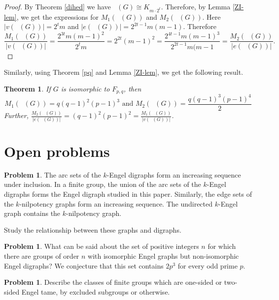\documentclass[reqno,12pt]{amsart}
\theoremstyle{plain}
\newtheorem{thm}{Theorem}[section]
\theoremstyle{definition}
\newtheorem{prob}[conj]{Problem}
\newcommand{\coeng}{\mathop{\mathcal{E}_c^-}}
\begin{document}
{\begin{proof}
By Theorem \ref{dihed}	we have $\coeng(G) \cong K_{m\cdot 2^t}$. Therefore, by Lemma \ref{ZI-lem}, we get the expressions for  $M_1(\coeng(G))$ and $M_2(\coeng(G))$.
Here $|v(\coeng(G))| = 2^tm$ and  $|e(\coeng(G))| = 2^{2t - 1}m(m - 1)$. Therefore
\[
\frac{M_{1}(\coeng(G))}{\vert v(\coeng(G)) \vert} = \frac{2^{3t}m(m - 1)^{2}}{2^{t}m} = 2^{2t}(m - 1)^2 = \frac{2^{4t - 1}m(m - 1)^{3}}{2^{2t - 1}m(m - 1} = \frac{M_{2}(\coeng(G))}{\vert e(\coeng(G)) \vert}.
\]
\end{proof}
Similarly, using Theorem \ref{pq} and Lemma \ref{ZI-lem}, we get the following result.
\begin{thm}
If $G$ is isomorphic to   $F_{p, q}$, then 
\[
M_1(\coeng(G)) = q(q - 1)^2(p - 1)^3 \text{ and } M_2(\coeng(G)) = \frac{q(q - 1)^{3}(p - 1)^{4}}{2}
\]
Further, $\displaystyle{\frac{M_{2}(\coeng(G))}{\vert e(\coeng(G)) \vert} = (q - 1)^2(p - 1)^2 = \frac{M_{1}(\coeng(G))}{\vert v(\coeng(G)) \vert}}$.
\end{thm}

\section{Open problems}

\begin{prob}
The arc sets of the $k$-Engel digraphs form an increasing sequence under
inclusion. In a finite group, the union of the arc sets of the $k$-Engel
digraphs forms the Engel digraph studied in this paper. Similarly, the edge
sets of the $k$-nilpotency graphs form an increasing sequence. The
undirected $k$-Engel graph contains the $k$-nilpotency graph.

Study the relationship between these graphs and digraphs.
\end{prob}

\begin{prob}
What can be said about the set of positive integers $n$ for which there are
groups of order $n$ with isomorphic Engel graphs but non-isomorphic Engel
digraphs? We conjecture that this set contains $2p^3$ for every odd prime $p$.
\end{prob}

\begin{prob}
Describe the classes of finite groups which are one-sided or two-sided Engel
tame, by excluded subgroups or otherwise.
\end{prob}

}
\end{document}
